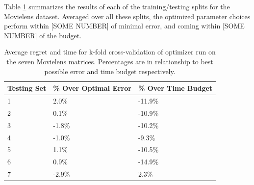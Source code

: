 Table \ref{fig:MovieCrossTable} summarizes the results of each of the training/testing splits for the Movielens dataset. Averaged over all these splits, the optimized parameter choices perform within [SOME NUMBER] of minimal error, and coming within [SOME NUMBER] of the budget.

\begin{table}
\label{fig:MovieCrossTable}
\begin{center}
    \begin{tabular}{| p{2.2cm} | p{2.2cm} | p{2.2cm} |}
    \hline
    Testing Set & \% Over Optimal Error & \% Over Time Budget \\ \hline
    1 & 2.0\% & -11.9\% \\ \hline
    2 & 0.1\% & -10.9\% \\ \hline
    3 & -1.8\% & -10.2\% \\ \hline
    4 & -1.0\% & -9.3\% \\ \hline
    5 & 1.1\% & -10.5\% \\ \hline
    6 & 0.9\% & -14.9\% \\ \hline
    7 & -2.9\% & 2.3\% \\ \hline
    \end{tabular}
\end{center}
\caption{Average regret and time for k-fold cross-validation of optimizer run on the seven Movielens matrices. Percentages are in relationship to best possible error and time budget respectively.}
\end{table}

